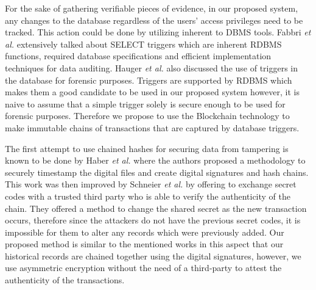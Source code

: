 		For the sake of gathering verifiable pieces of evidence, in our proposed system, any changes to the database regardless of the users' access privileges need to be tracked. This action could be done by utilizing inherent to DBMS tools. Fabbri {\it et al.} \cite{fabbri2013select} extensively talked about SELECT triggers which are inherent RDBMS functions, required database specifications and efficient implementation techniques for data auditing. Hauger {\it et al.}\cite{hauger2014information} also discussed the use of triggers in the database for forensic purposes. Triggers are supported by RDBMS which makes them a good candidate to be used in our proposed system however, it is naive to assume that a simple trigger solely is secure enough to be used for forensic purposes. Therefore we propose to use the Blockchain technology to make immutable chains of transactions that are captured by database triggers.

		The first attempt to use chained hashes for securing data from tampering is known to be done by Haber {\it et al.} \cite{haber1991how} where the authors proposed a methodology to securely timestamp the digital files and create digital signatures and hash chains. This work was then improved by Schneier {\it et al.} \cite{schneier1998cryptoraphic} \cite{schneier1999minimizing} \cite{schneier1999secure} by offering to exchange secret codes with a trusted third party who is able to verify the authenticity of the chain. They offered a method to change the shared secret as the new transaction occurs, therefore since the attackers do not have the previous secret codes, it is impossible for them to alter any records which were previously added. Our proposed method is similar to the mentioned works in this aspect that our historical records are chained together using the digital signatures, however, we use asymmetric encryption without the need of a third-party to attest the authenticity of the transactions.
